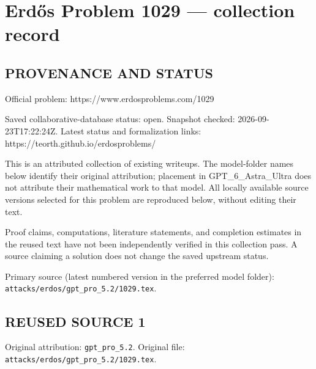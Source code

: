 \section*{Erd\H{o}s Problem 1029 --- collection record}

\subsection*{PROVENANCE AND STATUS}
Official problem: https://www.erdosproblems.com/1029

Saved collaborative-database status: open.
Snapshot checked: 2026-09-23T17:22:24Z.
Latest status and formalization links: https://teorth.github.io/erdosproblems/

This is an attributed collection of existing writeups. The model-folder names below identify their original attribution; placement in GPT\_6\_Astra\_Ultra does not attribute their mathematical work to that model. All locally available source versions selected for this problem are reproduced below, without editing their text.

Proof claims, computations, literature statements, and completion estimates in the reused text have not been independently verified in this collection pass. A source claiming a solution does not change the saved upstream status.

Primary source (latest numbered version in the preferred model folder): \texttt{attacks/erdos/gpt\_pro\_5.2/1029.tex}.

\subsection*{REUSED SOURCE 1}
Original attribution: \texttt{gpt\_pro\_5.2}.
Original file: \texttt{attacks/erdos/gpt\_pro\_5.2/1029.tex}.


